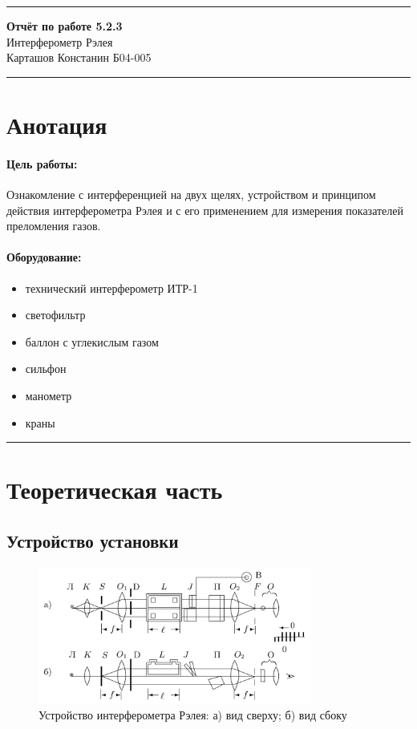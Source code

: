 \documentclass[a4paper,12pt]{article} %
\begin{document}


\hrule 	
\medskip
\begin{raggedright}
{\large \textbf{Отчёт по работе 5.2.3}}
\\
\medskip
{\Large Интерферометр Рэлея} 
\\
\medskip
{\large Карташов Констанин Б04-005}
\medskip
\hrule
\medskip
\end{raggedright}


\section{Анотация}

\paragraph{Цель работы:} 
Ознакомление с интерференцией на двух щелях, устройством и принципом действия интерферометра Рэлея и с его применением для измерения показателей преломления газов.

\paragraph{Оборудование:}
\begin{itemize}
\renewcommand{\labelitemi}{$\triangleright$}
\itemsep-0.5em
\item технический интерферометр ИТР-1
\item светофильтр
\item баллон с углекислым газом
\item сильфон
\item манометр
\item краны
\end{itemize}


\medskip\hrule\medskip
\FloatBarrier
\section{Теоретическая часть}


\subsection{Устройство установки}

\begin{figure}
\centering
\includegraphics[width=0.8\textwidth]{setup.jpg}
\caption{Устройство интерферометра Рэлея: а) вид сверху; б) вид сбоку}
\label{f:setup}
\end{figure}
\end{document}
